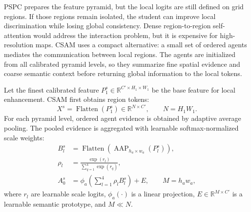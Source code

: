 \documentclass[a4paper,fleqn]{cas-dc}
\begin{document}
PSPC prepares the feature pyramid, but the local logits are still defined on
grid regions. If those regions remain isolated, the student can improve local
discrimination while losing global consistency. Dense region-to-region
self-attention would address the interaction problem, but it is expensive for
high-resolution maps. CSAM uses a compact alternative: a small set of ordered
agents mediates the communication between local regions. The agents are
initialized from all calibrated pyramid levels, so they summarize fine spatial
evidence and coarse semantic context before returning global information to
the local tokens.

Let the finest calibrated feature $P_1^s\in\mathbb{R}^{C'\times H_1\times W_1}$
be the base feature for local enhancement. CSAM first obtains region tokens:
\begin{equation}
    X^{s}=\operatorname{Flatten}(P_1^s)
    \in\mathbb{R}^{N\times C'},
    \qquad N=H_1W_1.
\label{eq:ama_region_tokens}
\end{equation}
For each pyramid level, ordered agent evidence is obtained by adaptive average
pooling. The pooled evidence is aggregated with learnable softmax-normalized
scale weights:
\begin{equation}
\begin{split}
    B_l^s &= \operatorname{Flatten}
    \left(\operatorname{AAP}_{h_a\times w_a}(P_l^s)\right),\\
    \rho_l &= \frac{\exp(r_l)}{\sum_{q=1}^{4}\exp(r_q)},\\
    A_0^s &= \phi_a\left(\sum_{l=1}^{4}\rho_l B_l^s\right)+E,
    \qquad M=h_aw_a,
\end{split}
\label{eq:ama_agent_init}
\end{equation}
where $r_l$ are learnable scale logits, $\phi_a(\cdot)$ is a linear
projection, $E\in\mathbb{R}^{M\times C'}$ is a learnable semantic prototype,
and $M\ll N$.
\end{document}

